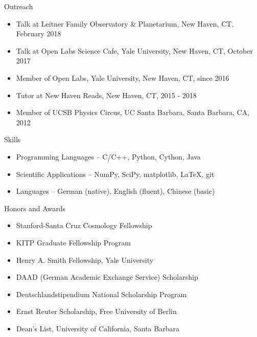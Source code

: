 \documentclass[11pt]{resume} %
\begin{document}
\begin{rSection}{Outreach}
  \begin{itemize}[leftmargin=1.0cm, topsep=0pt,itemsep=0pt,partopsep=0pt, parsep=0pt]
    \item Talk at Leitner Family Observatory \& Planetarium, New Haven, CT, February 2018
    \item Talk at Open Labs Science Cafe, Yale University, New Haven, CT, October 2017
    \item Member of Open Labs, Yale University, New Haven, CT, since 2016
    \item Tutor at New Haven Reads, New Haven, CT, 2015 - 2018
    \item Member of UCSB Physics Circus, UC Santa Barbara, Santa Barbara, CA, 2012
  \end{itemize}
\end{rSection}

\begin{rSection}{Skills}
  \begin{itemize}[leftmargin=1.0cm, topsep=0pt,itemsep=0pt,partopsep=0pt, parsep=0pt]
    \item Programming Languages – C/C++, Python, Cython, Java
    \item Scientific Applications – NumPy, SciPy, matplotlib, LaTeX, git
    \item Languages – German (native), English (fluent), Chinese (basic)
  \end{itemize}
\end{rSection}

\begin{rSection}{Honors and Awards}
  \begin{itemize}[leftmargin=1.0cm, topsep=0pt,itemsep=0pt,partopsep=0pt, parsep=0pt]
    \item Stanford-Santa Cruz Cosmology Fellowship
    \item KITP Graduate Fellowship Program
    \item Henry A. Smith Fellowship, Yale University
    \item DAAD (German Academic Exchange Service) Scholarship
    \item Deutschlandstipendium National Scholarship Program
    \item Ernst Reuter Scholarship, Free University of Berlin
    \item Dean's List, University of California, Santa Barbara
  \end{itemize}
\end{rSection}
\end{document}
